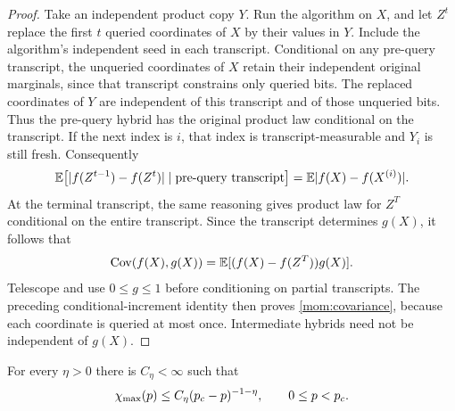 \begin{proof}
Take an independent product copy $Y$.  Run the algorithm on $X$,
and let $Z^t$ replace the first $t$ queried coordinates of $X$ by
their values in $Y$.  Include the algorithm's independent seed in
each transcript.  Conditional on any pre-query transcript, the
unqueried coordinates of $X$ retain their independent original
marginals, since that transcript constrains only queried bits.
The replaced coordinates of $Y$ are independent of this transcript
and of those unqueried bits.  Thus the pre-query hybrid has the
original product law conditional on the transcript.  If the next
index is $i$, that index is transcript-measurable and $Y_i$ is still
fresh.  Consequently
\[
 \mathbb E\bigl[\lvert f(Z^{t-1})-f(Z^t)\rvert
                     \mid\text{pre-query transcript}\bigr]
       =\mathbb E\lvert f(X)-f(X^{(i)})\rvert.
\]
At the terminal transcript, the same reasoning gives product law
for $Z^T$ conditional on the entire transcript.  Since the
transcript determines $g(X)$, it follows that
\[
 \operatorname{Cov}(f(X),g(X))=\mathbb E[(f(X)-f(Z^T))g(X)].
\]
Telescope and use $0\le g\le1$ before conditioning on partial
transcripts.  The preceding conditional-increment identity then
proves \eqref{mom:covariance}, because each coordinate is queried
at most once.  Intermediate hybrids need not be independent of
$g(X)$.
\end{proof}

\begin{proposition}
\label{mom:susceptibility}
For every $\eta>0$ there is $C_\eta<\infty$ such that
\begin{equation}
 \chi_{\max}(p)\le C_\eta({p_c}-p)^{-1-\eta},
 \qquad 0\le p<{p_c}.
 \label{eq:s22}
\end{equation}
\end{proposition}

